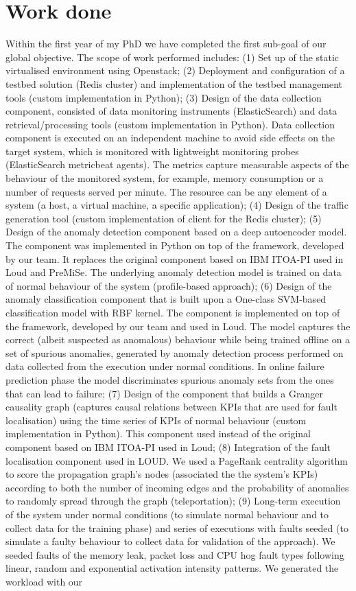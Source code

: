 \documentclass[]{usiinfprospectus}
\begin{document}
\section{Work done}
Within the first year of my PhD we have completed the first sub-goal of our global objective. The scope of work performed includes: (1) Set up of the static virtualised environment using Openstack; (2) Deployment and configuration of a testbed solution (Redis cluster) and implementation of the testbed management tools (custom implementation in Python); (3) Design of the data collection component, consisted of data monitoring instruments (ElasticSearch) and data retrieval/processing tools (custom implementation in Python). Data collection component is executed on an independent machine to avoid side effects on the target system, which is monitored with lightweight monitoring probes (ElasticSearch metricbeat agents). The metrics capture measurable aspects of the behaviour of the monitored system, for example, memory consumption or a number of requests served per minute. The resource can be any element of a system (a host, a virtual machine, a specific application); (4) Design of the traffic generation tool (custom implementation of client for the Redis cluster); (5) Design of the anomaly detection component based on a deep autoencoder model. The component was implemented in Python on top of the framework, developed by our team. It replaces the original component based on IBM ITOA-PI used in Loud and PreMiSe. The underlying anomaly detection model is trained on data of normal behaviour of the system (profile-based approach); (6) Design of the anomaly classification component that is built upon a One-class SVM-based classification model with RBF kernel. The component is implemented on top of the framework, developed by our team and used in Loud. The model captures the correct (albeit suspected as anomalous) behaviour while being trained offline on a set of spurious anomalies, generated by anomaly detection process performed on data collected from the execution under normal conditions. In online failure prediction phase the model discriminates spurious anomaly sets from the ones that can lead to failure; (7) Design of the component that builds a Granger causality graph (captures causal relations between KPIs that are used for fault localisation) using the time series of KPIs of normal behaviour (custom implementation in Python). This component used instead of the original component based on IBM ITOA-PI used in Loud; (8) Integration of the fault localisation component used in LOUD. We used a PageRank centrality algorithm to score the propagation graph's nodes (associated the the system's KPIs) according to both the number of incoming edges and the probability of anomalies to randomly spread through the graph (teleportation); (9) Long-term execution of the system under normal conditions (to simulate normal behaviour and to collect data for the training phase) and series of executions with faults seeded (to simulate a faulty behaviour to collect data for validation of the approach). We seeded faults of the memory leak, packet loss and CPU hog fault types following linear, random and exponential activation intensity patterns. We generated the workload with our 
\end{document}

